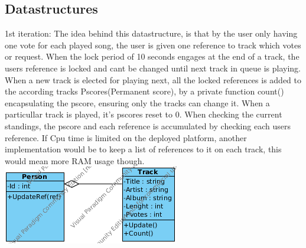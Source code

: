 \subsection{Datastructures}

1st iteration:
The idea behind this datastructure, is that by the user only having one vote for each played song, the user is given one reference to track which votes or request. When the lock period of 10 seconds engages at the end of a track, the users reference is locked and cant be changed until next track in queue is playing. When a new track is elected for playing next, all the locked references is added to the according tracks Pscores(Permanent score), by a private function count() encapsulating the pscore, ensuring only the tracks can change it. When a particullar track is played, it's pscores reset to 0. When checking the current standings, the pscore and each reference is accumulated by checking each users reference. If Cpu time is limited on the deployed platform, another implementation would be to keep a list of references to it on each track, this would mean more RAM usage though.
\includegraphics{Images/BackendDSv1.png}